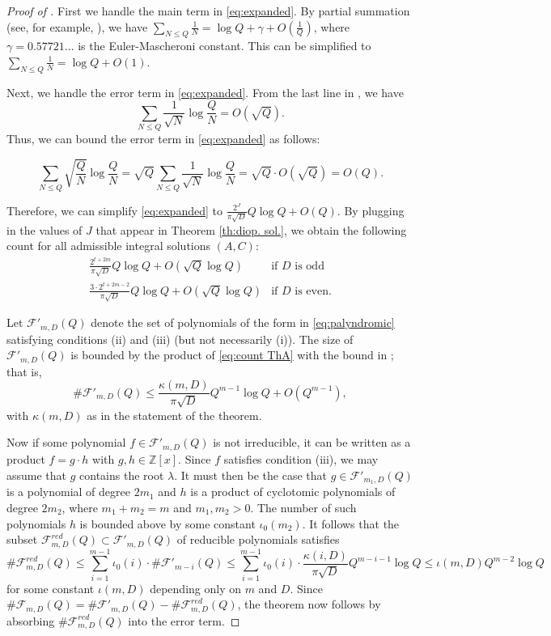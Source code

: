 \documentclass[12pt]{amsart}
\newcommand{\Z}{\mathbb{Z}}
\theoremstyle{plain}
\begin{document}
\begin{proof}[Proof of ]
 First we handle the main term in \eqref{eq:expanded}. By partial summation (see, for example, \cite[Theorem 422]{hardywright68}),  we have $\sum_{N\leq Q} \frac{1}{N} = \log Q + \gamma + O(\frac{1}{Q})$, where $\gamma = 0.57721...$ is the Euler-Mascheroni constant. This can be simplified to $\sum_{N\leq Q} \frac{1}{N} = \log Q + O(1).$

 Next, we handle the error term in \eqref{eq:expanded}. From the last line in \cite[Section 2]{fricker}, we have
 \[ \sum_{N \leq Q} \frac{1}{\sqrt{N}} \log \frac{Q}{N} = O(\sqrt{Q}). \] Thus, we can bound the error term in \eqref{eq:expanded} as follows:
 
\[ \sum_{N \leq Q} \sqrt{\frac{Q}{N}} \log \frac{Q}{N} = \sqrt{Q} \sum_{N \leq Q} \frac{1}{\sqrt{N}} \log \frac{Q}{N} = \sqrt{Q} \cdot O(\sqrt{Q})= O(Q). \]

 
 Therefore, we can simplify \eqref{eq:expanded} to $\frac{2^J}{\pi \sqrt{D}} Q \log Q + O(Q).$ By plugging in the values of $J$ that appear in Theorem \ref{th:diop. sol.}, we obtain the following count for all admissible integral solutions $(A,C)$:
\begin{equation}\label{eq:count ThA}
\begin{array}{ll}
    \frac{2^{t+2m}}{\pi\sqrt{D}}Q\log Q + O(\sqrt{Q}\log Q) & \text{if $D$ is odd} \\
    \frac{3\cdot2^{t+2m-2}}{\pi\sqrt{D}}Q\log Q + O(\sqrt{Q}\log Q) & \text{if $D$ is even.} 
\end{array}
\end{equation}

Let $\mathcal{F}'_{m,D}(Q)$ denote the set of polynomials of the form in \eqref{eq:palyndromic} satisfying conditions (ii) and (iii) (but not necessarily (i)). The size of $\mathcal{F}'_{m,D}(Q)$ is bounded by the product of \eqref{eq:count ThA} with the bound in ; that is,
    \[
    \# \mathcal{F}'_{m,D}(Q) \leq \frac{\kappa(m,D)}{\pi\sqrt{D}}Q^{m-1}\log Q + O(Q^{m-1}), 
    \]
with $\kappa(m,D)$ as in the statement of the theorem.

Now if some polynomial $f\in \mathcal{F}'_{m,D}(Q)$ is not irreducible, it can be written as a product $f=g\cdot h$ with $g,h\in\Z[x]$. Since $f$ satisfies condition (iii), we may assume that $g$ contains the root $\lambda$. It must then be the case that $g\in \mathcal{F}'_{m_1,D}(Q)$ is a polynomial of degree $2m_1$ and $h$ is a product of cyclotomic polynomials of degree $2m_2$, where $m_1+m_2=m$ and $m_1,m_2>0$. The number of such polynomials $h$ is bounded above by some constant $\iota_0(m_2)$. It follows that the subset $\mathcal{F}^{red}_{m,D}(Q)\subset \mathcal{F}'_{m,D}(Q)$ of reducible polynomials satisfies  
    \[
    \# \mathcal{F}^{red}_{m,D}(Q) \leq \sum_{i=1}^{m-1}\iota_0(i)\cdot \#\mathcal{F}'_{m-i}(Q)
    \leq \sum_{i=1}^{m-1}\iota_0(i)\cdot \frac{\kappa(i,D)}{\pi\sqrt{D}}Q^{m-i-1}\log Q
    \leq \iota(m,D) Q^{m-2}\log Q
    \]
for some constant $\iota(m,D)$ depending only on $m$ and $D$. Since $\# \mathcal{F}_{m,D}(Q)=\# \mathcal{F}'_{m,D}(Q) - \# \mathcal{F}^{red}_{m,D}(Q)$, the theorem now follows by absorbing $\# \mathcal{F}^{red}_{m,D}(Q)$ into the error term.
\end{proof}
\end{document}
